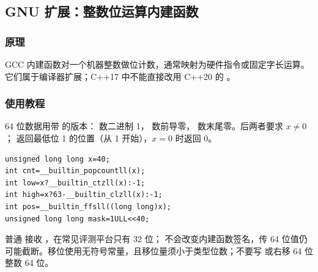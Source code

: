 \subsection{GNU 扩展：整数位运算内建函数}
\label{stl:builtins}
\subsubsection*{原理}
GCC 内建函数对一个机器整数做位计数，通常映射为硬件指令或固定字长运算。它们属于编译器扩展；C++17 中不能直接改用 C++20 的 。
\subsubsection*{使用教程}
64 位数据用带  的版本： 数二进制 1， 数前导零， 数末尾零。后两者要求 $x\ne0$； 返回最低位 1 的位置（从 1 开始），$x=0$ 时返回 0。
\begin{lstlisting}[style=mtycpp,numbers=none]
unsigned long long x=40;
int cnt=__builtin_popcountll(x);
int low=x?__builtin_ctzll(x):-1;
int high=x?63-__builtin_clzll(x):-1;
int pos=__builtin_ffsll((long long)x);
unsigned long long mask=1ULL<<40;
\end{lstlisting}
普通  接收 ，在常见评测平台只有 32 位； 不会改变内建函数签名，传 64 位值仍可能截断。移位使用无符号常量，且移位量须小于类型位数；不要写  或右移 64 位整数 64 位。

